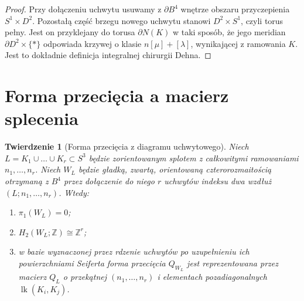 \documentclass[11pt,a4paper]{report}
\numberwithin{equation}{section}
\theoremstyle{plain}
\newtheorem{twierdzenie}{Twierdzenie}[section]
\theoremstyle{definition}
\theoremstyle{remark}
\begin{document}
\begin{proof}
Przy dołączeniu uchwytu usuwamy z $\partial B^4$
wnętrze obszaru przyczepienia $S^1\times D^2$.
Pozostałą część brzegu nowego uchwytu stanowi
$D^2\times S^1$, czyli torus pełny. Jest on przyklejany
do torusa $\partial N(K)$ w taki sposób, że jego
meridian $\partial D^2\times\{*\}$ odpowiada krzywej
o klasie $n[\mu]+[\lambda]$, wynikającej z ramowania
$K$. Jest to dokładnie definicja integralnej chirurgii
Dehna.
\end{proof}

\begin{center}
\end{center}

\section{Forma przecięcia a macierz splecenia}
\label{sec:kt-intersection}

\begin{twierdzenie}[Forma przecięcia z diagramu uchwytowego]
Niech $L=K_1\cup\dots\cup K_r\subset S^3$ będzie
zorientowanym splotem z całkowitymi ramowaniami
$n_1,\dots,n_r$. Niech $W_L$ będzie gładką, zwartą,
orientowaną czterorozmaitością otrzymaną z $B^4$
przez dołączenie do niego $r$ uchwytów indeksu dwa
wzdłuż $(L;n_1,\dots,n_r)$. Wtedy:
\begin{enumerate}[label=(\roman*)]
\item $\pi_1(W_L)=0$;
\item $H_2(W_L;\mathbb Z)\cong\mathbb Z^r$;
\item w bazie wyznaczonej przez rdzenie uchwytów po
uzupełnieniu ich powierzchniami Seiferta forma przecięcia
$Q_{W_L}$ jest reprezentowana przez macierz
$Q_L$ o przekątnej $(n_1,\dots,n_r)$ i elementach
pozadiagonalnych $\operatorname{lk}(K_i,K_j)$.
\end{enumerate}
\end{twierdzenie}
\end{document}
